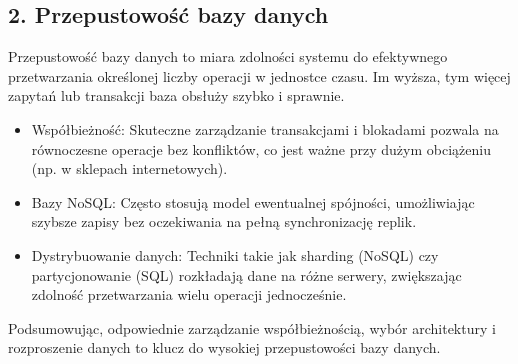 \documentclass[a4paper,11pt,openany,english]{sphinxmanual}
\begin{document}
\subsection{2. Przepustowość bazy danych}
\label{\detokenize{rozdzial2/index:przepustowosc-bazy-danych}}
\sphinxAtStartPar
Przepustowość bazy danych to miara zdolności systemu do efektywnego przetwarzania określonej liczby operacji w jednostce czasu. Im wyższa, tym więcej zapytań lub transakcji baza obsłuży szybko i sprawnie.
\begin{description}
\begin{itemize}
\item {} 
\sphinxAtStartPar
Współbieżność: Skuteczne zarządzanie transakcjami i blokadami pozwala na równoczesne operacje bez konfliktów, co jest ważne przy dużym obciążeniu (np. w sklepach internetowych).

\item {} 
\sphinxAtStartPar
Bazy NoSQL: Często stosują model ewentualnej spójności, umożliwiając szybsze zapisy bez oczekiwania na pełną synchronizację replik.

\item {} 
\sphinxAtStartPar
Dystrybuowanie danych: Techniki takie jak sharding (NoSQL) czy partycjonowanie (SQL) rozkładają dane na różne serwery, zwiększając zdolność przetwarzania wielu operacji jednocześnie.

\end{itemize}

\end{description}

\sphinxAtStartPar
Podsumowując, odpowiednie zarządzanie współbieżnością, wybór architektury i rozproszenie danych to klucz do wysokiej przepustowości bazy danych.
\end{document}
